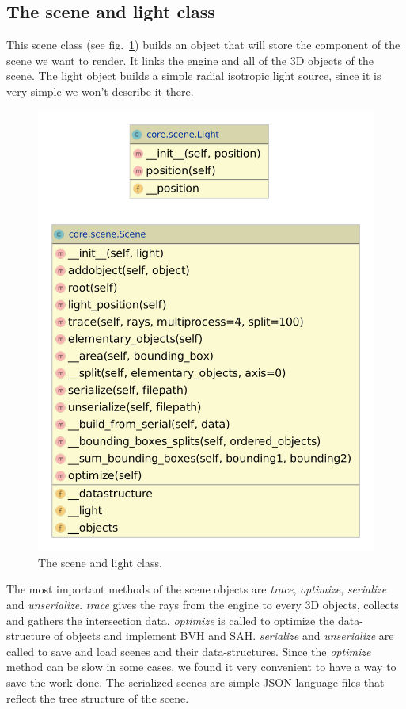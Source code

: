 \documentclass[acmsmall]{acmart}
\begin{document}
\subsection*{The scene and light class}
This scene class (see fig.~\ref{fig:scene}) builds an object that will store the component of the scene we want to render.
It links the engine and all of the 3D objects of the scene.
The light object builds a simple radial isotropic light source, since it is very simple we won't describe it there.
\begin{figure}[h]
    \centering
    \includegraphics[scale=0.3]{img/scene.pdf}
    \caption{The scene and light class.}
    \label{fig:scene}
\end{figure}
The most important methods of the scene objects are \emph{trace}, \emph{optimize}, \emph{serialize} and \emph{unserialize}.
\emph{trace} gives the rays from the engine to every 3D objects, collects and gathers the intersection data.
\emph{optimize} is called to optimize the data-structure of objects and implement BVH and SAH.
\emph{serialize} and \emph{unserialize} are called to save and load scenes and their data-structures.
Since the \emph{optimize} method can be slow in some cases, we found it very convenient to have a way to save the work done.
The serialized scenes are simple JSON language files that reflect the tree structure of the scene.
\end{document}
